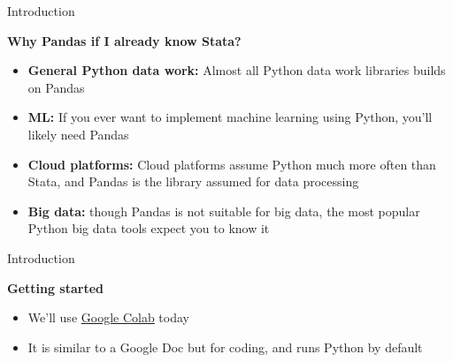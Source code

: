 \documentclass[aspectratio=169]{beamer}
\begin{document}
\begin{frame}{Introduction}

	\textbf{Why Pandas if I already know Stata?}

	\begin{itemize}
		\item \textbf{General Python data work:} Almost all Python data work libraries builds on Pandas
		\item \textbf{ML:} If you ever want to implement machine learning using Python, you'll likely need Pandas
		\item \textbf{Cloud platforms:} Cloud platforms assume Python much more often than Stata, and Pandas is the library assumed for data processing
		\item \textbf{Big data:} though Pandas is not suitable for big data,  the most popular Python big data tools expect you to know it
	\end{itemize}

\end{frame}

\begin{frame}{Introduction}

	\textbf{Getting started}

	\begin{itemize}
		\item We'll use \href{http://colab.research.google.com}{Google Colab} today
		\item It is similar to a Google Doc but for coding, and runs Python by default
	\end{itemize}

\end{frame}
\end{document}
